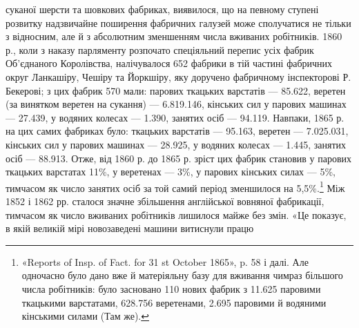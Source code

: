суканої шерсти та шовкових фабриках, виявилося, що на певному
ступені розвитку надзвичайне поширення фабричних галузей
може сполучатися не тільки з відносним, але й з абсолютним
зменшенням числа вживаних робітників. 1860 р., коли з наказу
парляменту розпочато спеціяльний перепис усіх фабрик Об’єднаного
Королівства, налічувалося 652 фабрики в тій частині
фабричних округ Ланкашіру, Чешіру та Йоркшіру, яку доручено
фабричному інспекторові Р. Бекерові; з цих фабрик 570 мали:
парових ткацьких варстатів — 85.622, веретен (за винятком веретен
на сукання) — 6.819.146, кінських сил у парових машинах —
27.439, у водяних колесах — 1.390, занятих осіб — 94.119.
Навпаки, 1865 р. на цих самих фабриках було: ткацьких варстатів
— 95.163, веретен — 7.025.031, кінських сил у парових машинах
— 28.925, у водяних колесах — 1.445, занятих осіб —
88.913. Отже, від 1860 р. до 1865 р. зріст цих фабрик становив
у парових ткацьких варстатах 11\%, у веретенах — 3\%, у парових
кінських силах — 5\%, тимчасом як число занятих осіб за той
самий період зменшилося на 5,5\%.\footnote{
«Reports of Insp. of Fact. for 31 st October 1865», p. 58 і далі.
Але одночасно було дано вже й матеріяльну базу для вживання чимраз
більшого числа робітників: було засновано 110 нових фабрик з 11.625 паровими
ткацькими варстатами, 628.756 веретенами, 2.695 паровими й водяними
кінськими силами (Там же).
} Між 1852 і 1862 рр. сталося
значне збільшення англійської вовняної фабрикації, тимчасом як
число вживаних робітників лишилося майже без змін. «Це показує,
в якій великій мірі новозаведені машини витиснули працю
\parbreak{}  %
